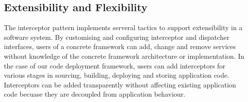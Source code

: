\subsection{Extensibility and Flexibility}
The interceptor pattern implements serveral tactics to support extensibility in a software system. By customising and configuring interceptor and dispatcher interfaces, users of a concrete framework can add, change and remove services without knowledge of the concrete framework architecture or implementation. In the case of our code deployment framework, users can add interceptors for various stages in sourcing, building, deploying and storing application code. Interceptors can be added transparently without affecting existing application code becuase they are decoupled from application behaviour.